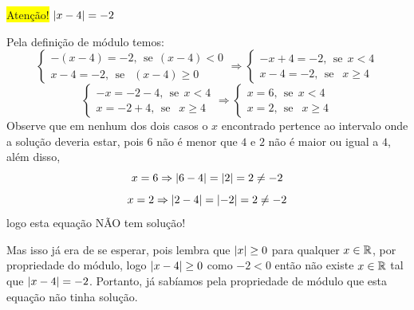 \begin{exem}
 \colorbox{yellow}{Atenção!} $\left|x-4\right|=-2$

     Pela definição de módulo temos:
     \[
    \begin{cases}
      -(x-4)= -2, \ \ \text{se} \ \ (x-4) < 0 \\
        x-4 = -2, \ \ \text{se } \ \ (x-4) \geq 0
     \end{cases}
     \Rightarrow
     \begin{cases}
      -x+4= -2, \ \ \text{se} \ \ x < 4 \\
       x-4= -2, \ \ \text{se } \ \ x \geq 4
     \end{cases}
     \]
     \[
     \begin{cases}
      -x= -2-4, \ \ \text{se} \ \ x < 4 \\
       x= -2+4, \ \ \text{se } \ \ x \geq 4
     \end{cases}
     \Rightarrow
     \begin{cases}
      x= 6, \ \ \text{se} \ \ x < 4 \\
      x= 2, \ \ \text{se } \ \ x \geq 4
     \end{cases}
     \]
 Observe que em nenhum dos dois casos o $x$ encontrado pertence ao intervalo onde a solução deveria estar, pois $6$ não é menor que $4$ e $2$ não é maior ou igual a $4$, além disso,
\begin{equation}
x=6 \Rightarrow \left|6-4\right|= \left|2\right|= 2 \neq -2
\end{equation}
\begin{equation}
x=2 \Rightarrow \left|2-4\right|= \left|-2\right|= 2 \neq -2
\end{equation}
 logo esta equação NÃO tem solução!

 Mas isso já era de se esperar, pois lembra que $\left|x\right|\geq 0$ para qualquer $x \in \mathbb{R}$, por propriedade do módulo, logo $\left|x-4\right| \geq 0$ como $-2< 0$ então não existe $x \in \mathbb{R}$ tal que $\left|x-4\right|= -2$. Portanto, já sabíamos pela propriedade de módulo que esta equação não tinha solução.
\end{exem}

